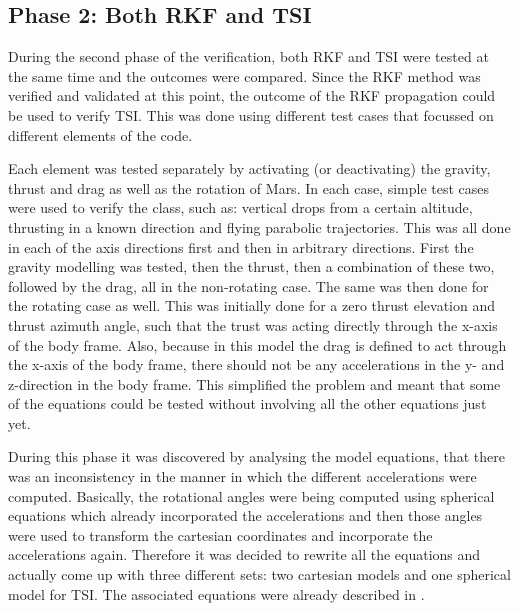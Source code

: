 \subsection{Phase 2: Both \ac{RKF} and \ac{TSI}}
\label{subsec:phase2com}
During the second phase of the verification, both \ac{RKF} and \ac{TSI} were tested at the same time and the outcomes were compared. Since the \ac{RKF} method was verified and validated at this point, the outcome of the \ac{RKF} propagation could be used to verify \ac{TSI}. This was done using different test cases that focussed on different elements of the code.

Each element was tested separately by activating (or deactivating) the gravity, thrust and drag as well as the rotation of Mars. In each case, simple test cases were used to verify the class, such as: vertical drops from a certain altitude, thrusting in a known direction and flying parabolic trajectories. This was all done in each of the axis directions first and then in arbitrary directions. First the gravity modelling was tested, then the thrust, then a combination of these two, followed by the drag, all in the non-rotating case. The same was then done for the rotating case as well. This was initially done for a zero thrust elevation and thrust azimuth angle, such that the trust was acting directly through the x-axis of the body frame. Also, because in this model the drag is defined to act through the x-axis of the body frame, there should not be any accelerations in the y- and z-direction in the body frame. This simplified the problem and meant that some of the equations could be tested without involving all the other equations just yet.

During this phase it was discovered by analysing the model equations, that there was an inconsistency in the manner in which the different accelerations were computed. Basically, the rotational angles were being computed using spherical equations which already incorporated the accelerations and then those angles were used to transform the cartesian coordinates and incorporate the accelerations again. Therefore it was decided to rewrite all the equations and actually come up with three different sets: two cartesian models and one spherical model for \ac{TSI}. The associated equations were already described in .

